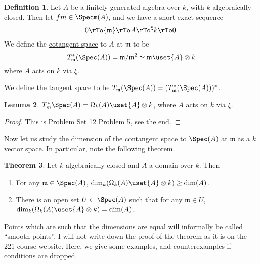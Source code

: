 \documentclass[12 pt]{article}
\theoremstyle{definition}
\newtheorem{thm}{Theorem}[section]
\newtheorem{lemma}[thm]{Lemma}
\newtheorem{defn}[thm]{Definition}
\renewcommand{\(}{\left(}
\renewcommand{\)}{\right)}
\newcommand\fm{{\mathfrak m}}
\begin{document}
\begin{defn}
Let $A$ be a finitely generated algebra over $k$, with $k$ algebraically closed. Then let $fm \in \Specm(A)$, and we have a short exact sequence
\[0 \rTo \fm \rTo A \rTo^\xi k \rTo 0.\] We define the \underline{cotangent space} to $A$ at $\fm$ to be
\[T_{\fm}^*(\Spec(A))=\fm/\fm^2 \simeq \fm \uset{A} \otimes k\]
where $A$ acts on $k$ via $\xi$.

We define the tangent space to be $T_\fm(\Spec(A))=(T_\fm^*(\Spec(A)))^*$.

\end{defn}

\begin{lemma} $T_m^*\Spec(A)=\Omega_k(A) \uset{A}\otimes k$, where $A$ acts on $k$ via $\xi$.
\end{lemma}
\begin{proof} This is Problem Set 12 Problem 5, see the end.
\end{proof}




Now let us study the dimension of the contangent space to $\Spec(A)$ at $\fm$ as a $k$ vector space. In particular, note the following theorem.
\begin{thm} Let $k$ algebraically closed and $A$ a domain over $k$. Then
\begin{enumerate}
\item For any $\fm \in \Spec(A)$, $\dim_{k}(\Omega_k(A) \uset{A} \otimes k) \geq \dim(A)$.

\item There is an open set $U \subset \Spec(A)$ such that for any $\fm \in U$, $\dim_{k}(\Omega_k(A) \uset{A}\otimes k)=\dim(A)$.
\end{enumerate}
\label{dmn over alg clos k, exists open of smooths}
\end{thm}

Points which are such that the dimensions are equal will informally be called ``smooth points''. I will not write down the proof of the theorem as it is on the 221 course website. Here, we give some examples, and counterexamples if conditions are dropped.
\end{document}
